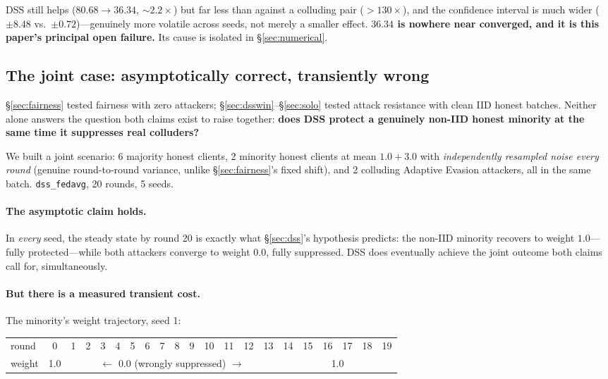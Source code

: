 \documentclass[11pt,a4paper]{article}
\newcommand{\code}[1]{\texttt{\small #1}}
\newcommand{\bad}[1]{\textcolor{red!70!black}{#1}}
\begin{document}
DSS still helps ($80.68 \rightarrow 36.34$, ${\sim}2.2\times$) but far
less than against a colluding pair (${>}130\times$), and the confidence
interval is much wider ($\pm 8.48$ vs.\ $\pm 0.72$)---genuinely more
volatile across seeds, not merely a smaller effect. \textbf{$36.34$ is
nowhere near converged, and it is this paper's principal open failure.}
Its cause is isolated in \S\ref{sec:numerical}.

\subsection{The joint case: asymptotically correct, transiently wrong}
\label{sec:joint}

\S\ref{sec:fairness} tested fairness with zero attackers;
\S\ref{sec:dsswin}--\S\ref{sec:solo} tested attack resistance with clean
IID honest batches. Neither alone answers the question both claims exist
to raise together: \textbf{does DSS protect a genuinely non-IID honest
minority at the same time it suppresses real colluders?}

We built a joint scenario: 6 majority honest clients, 2 minority honest
clients at mean $1.0 + 3.0$ with \emph{independently resampled noise every
round} (genuine round-to-round variance, unlike \S\ref{sec:fairness}'s
fixed shift), and 2 colluding Adaptive Evasion attackers, all in the same
batch. \code{dss\_fedavg}, 20 rounds, 5 seeds.

\paragraph{The asymptotic claim holds.} In \emph{every} seed, the steady
state by round 20 is exactly what \S\ref{sec:dss}'s hypothesis predicts:
the non-IID minority recovers to weight $1.0$---fully protected---while
both attackers converge to weight $0.0$, fully suppressed. DSS does
eventually achieve the joint outcome both claims call for, simultaneously.

\paragraph{But there is a measured transient cost.} The minority's weight
trajectory, seed 1:
\begin{center}
\small
\begin{tabular}{l|cccccccccccccc|cccccc}
round  & 0 & 1 & 2 & 3 & 4 & 5 & 6 & 7 & 8 & 9 & 10 & 11 & 12 & 13 & 14 & 15 & 16 & 17 & 18 & 19\\
weight & 1.0 & \multicolumn{13}{c|}{$\longleftarrow$ \bad{0.0 (wrongly suppressed)} $\longrightarrow$} & \multicolumn{6}{c}{1.0} \\
\end{tabular}
\end{center}
\end{document}
